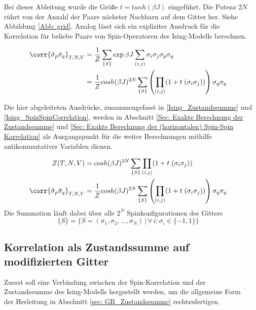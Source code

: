 \noindent Bei dieser Ableitung wurde die Größe $t = tanh(\beta J)$ eingeführt. Die Potenz $2N$ rührt von der Anzahl der Paare nächster Nachbarn auf dem Gitter her. Siehe Abbildung \ref{Abb: grid}. Analog lässt sich ein expliziter Ausdruck für die Korrelation für beliebe Paare von Spin-Operatoren des Ising-Modells berechnen.

\begin{align} 
    \corr{\hat{\sigma}_{p} \hat{\sigma}_{q} }_{T,N,V}  
    & = \frac{1}{Z} \sum_{\{S\}} \exp{\beta J \sum_{(i,j)} \sigma_i \sigma_j } \sigma_{p} \sigma_{q} \\
    & = \frac{1}{Z} cosh(\beta J)^{2N} \sum_{\{S\}} \left(\prod_{(i,j)} (1 +  t \; (\sigma_i \sigma_j) )\right) \sigma_{q} \sigma_{q} 
\end{align}

\noindent Die hier abgeleiteten Ausdrücke, zusammengefasst in  \eqref{Ising_Zustandssumme} und \eqref{Ising_SpinSpinCorrelation}, werden in Abschnitt \ref{Sec: Exakte Berechnung der Zustandssumme} und \ref{Sec: Exakte Berechnung der (horizontalen) Spin-Spin Korrelation} als Ausgangspunkt für die weiter Berechnungen mithilfe antikommutativer Variablen dienen.

\begin{grayframe}[frametitle = {Zustandssumme und Spin-Spin-Korrelation für 2d Ising-Modell}]
\begin{align}
 Z(T,N,V)  
  & = cosh(\beta J)^{2N} \sum_{\{S\}} \prod_{(i,j)} (1 +  t \; (\sigma_i \sigma_j)) \label{Ising_Zustandssumme} \\
\corr{\hat{\sigma}_{p} \hat{\sigma}_{q} }_{T,N,V} 
  & = \frac{1}{Z} cosh(\beta J)^{2N} \sum_{\{S\}} \left(\prod_{(i,j)} (1 +  t \; (\sigma_i \sigma_j) )\right) \sigma_{q} \sigma_{q} \label{Ising_SpinSpinCorrelation}
\end{align}
\centering
\noindent Die Summation läuft dabei über alle $2^N$ Spinkonfigurationen des Gitters
$$\{S\} = \{S = (\sigma_1, \sigma_2, \dots,\sigma_N) \,\vert\, \forall\,i : \sigma_i \in \{-1, 1\}\}$$
\end{grayframe}

\subsection{Korrelation als Zustandssumme auf modifizierten Gitter} 
Zuerst soll eine Verbindung zwischen der Spin-Korrelation und der Zustandssumme des Ising-Modells hergestellt werden, um die allgemeine Form der Herleitung in Abschnitt \ref{sec: GR_Zustandssumme} rechtzufertigen.

